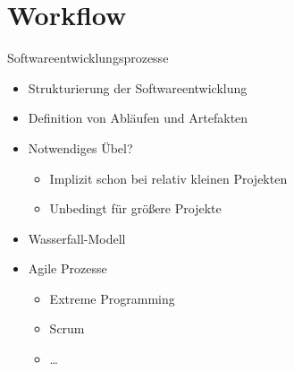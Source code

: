 \section{Workflow}
\begin{frame}{Softwareentwicklungsprozesse}
	\begin{itemize}
		\item Strukturierung der Softwareentwicklung
		\item Definition von Abläufen und Artefakten
		\item Notwendiges Übel?
		\begin{itemize}
			\item Implizit schon bei relativ kleinen Projekten
			\item Unbedingt für größere Projekte
		\end{itemize}
	\end{itemize}
	
	\begin{itemize}
		\item Wasserfall-Modell
		\item Agile Prozesse
		\begin{itemize}
			\item Extreme Programming
			\item Scrum
			\item \dots
		\end{itemize}
	\end{itemize}
\end{frame}

